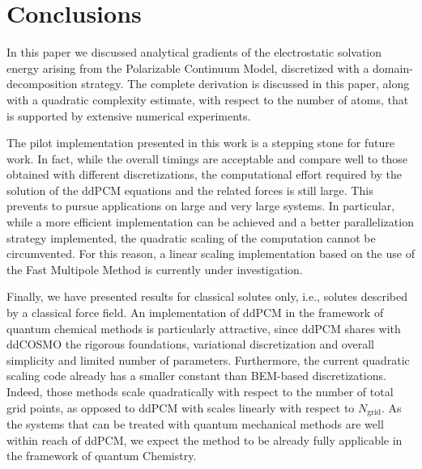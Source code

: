 \section{Conclusions}\label{sec:conclusions}

In this paper we discussed analytical gradients of the electrostatic solvation energy arising from the Polarizable Continuum Model, discretized with a domain-decomposition strategy. The complete derivation is discussed in this paper, along with a quadratic complexity estimate, with respect to the number of atoms, that is supported by extensive numerical experiments.


The pilot implementation presented in this work is a stepping stone for future work. In fact, while the overall timings are acceptable and compare well to those obtained with different discretizations, the computational effort required by the solution of the ddPCM equations and the related forces is still large. This prevents to pursue applications on large and very large systems. In particular, while a more efficient implementation can be achieved and a better parallelization strategy implemented, the quadratic scaling of the computation cannot be circumvented. For this reason, a linear scaling implementation based on the use of the Fast Multipole Method is currently under investigation.

Finally, we have presented results for classical solutes only, i.e., solutes described by a classical force field. An implementation of ddPCM in the framework of quantum chemical methods is particularly attractive, since ddPCM shares with ddCOSMO the rigorous foundations, variational discretization and overall simplicity and limited number of parameters. Furthermore, the current quadratic scaling code already has a smaller constant than BEM-based discretizations. Indeed, those methods scale quadratically with respect to the number of total grid points, as opposed to ddPCM with scales linearly with respect to $N_\text{grid}$. As the systems that can be treated with quantum mechanical methods are well within reach of ddPCM, we expect the method to be already fully applicable in the framework of quantum Chemistry. 
